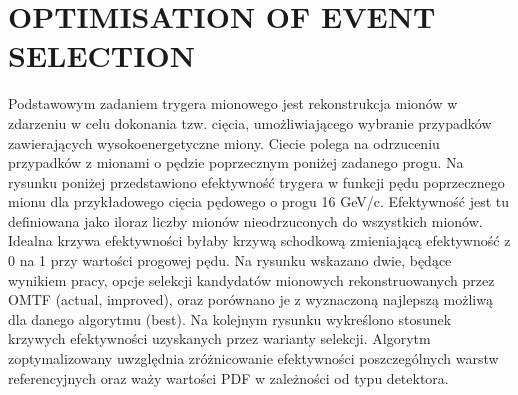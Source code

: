 \section{OPTIMISATION OF EVENT SELECTION}  

Podstawowym zadaniem trygera mionowego jest rekonstrukcja mionów w zdarzeniu w celu dokonania  tzw. cięcia, umożliwiającego wybranie przypadków zawierających wysokoenergetyczne miony. Ciecie polega na odrzuceniu przypadków z mionami o pędzie poprzecznym poniżej zadanego progu. Na rysunku poniżej przedstawiono efektywność trygera w funkcji pędu poprzecznego mionu dla przykładowego cięcia pędowego o progu 16 GeV/c. Efektywność jest tu definiowana jako iloraz liczby mionów nieodrzuconych do wszystkich mionów. Idealna krzywa efektywności byłaby krzywą schodkową zmieniającą efektywność z 0 na 1 przy wartości progowej pędu. Na rysunku wskazano dwie, będące wynikiem pracy, opcje selekcji kandydatów mionowych rekonstruowanych przez OMTF (actual, improved), oraz porównano je z wyznaczoną najlepszą możliwą dla danego algorytmu (best). Na kolejnym rysunku wykreślono stosunek krzywych efektywności uzyskanych przez warianty selekcji. Algorytm zoptymalizowany uwzględnia zróżnicowanie efektywności poszczególnych warstw referencyjnych oraz waży wartości PDF w zależności od typu detektora.                                                                          

